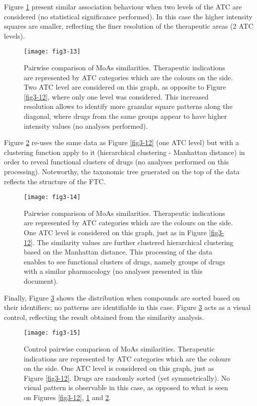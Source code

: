 Figure \ref{fig3-13} present similar association behaviour when two levels of the ATC are considered (no statistical significance performed). In this case the higher intensity squares are smaller, reflecting the finer resolution of the therapeutic areas (2 ATC levels).

\begin{figure}[H]
    \centering
    \texttt{[image: fig3-13]}
    \caption{Pairwise comparison of MoAs similarities. Therapeutic indications are represented by ATC categories which are the colours on the side. Two ATC level are considered on this graph, as opposite to Figure \ref{fig3-12}, where only one level was considered. This increased resolution allows to identify more granular square patterns along the diagonal, where drugs from the same groups appear to have higher intensity values (no analyses performed).}
    \label{fig3-13}
\end{figure}

Figure \ref{fig3-14} re-uses the same data as Figure \ref{fig3-12} (one ATC level) but with a clustering function apply to it (hierarchical clustering - Manhattan distance) in order to reveal functional clusters of drugs (no analyses performed on this processing). Noteworthy, the taxonomic tree generated on the top of the data reflects the structure of the FTC.

\begin{figure}[H]
    \centering
    \texttt{[image: fig3-14]}
    \caption{Pairwise comparison of MoAs similarities. Therapeutic indications are represented by ATC categories which are the colours on the side. One ATC level is considered on this graph, just as in Figure \ref{fig3-12}. The similarity values are further clustered hierarchical clustering based on the Manhattan distance. This processing of the data enables to see functional clusters of drugs, namely groups of drugs with a similar pharmacology (no analyses presented in this document).}
    \label{fig3-14}
\end{figure}

Finally, Figure \ref{fig3-15} shows the distribution when compounds are sorted based on their identifiers; no patterns are identifiable in this case. Figure \ref{fig3-15} acts as a visual control, reflecting the result obtained from the similarity analysis.

\begin{figure}[H]
    \centering
    \texttt{[image: fig3-15]}
    \caption{Control pairwise comparison of MoAs similarities. Therapeutic indications are represented by ATC categories which are the colours on the side. One ATC level is considered on this graph, just as Figure \ref{fig3-12}. Drugs are randomly sorted (yet symmetrically). No visual pattern is observable in this case, as opposed to what is seen on Figures \ref{fig3-12}, \ref{fig3-13} and \ref{fig3-14}.}
    \label{fig3-15}
\end{figure}

